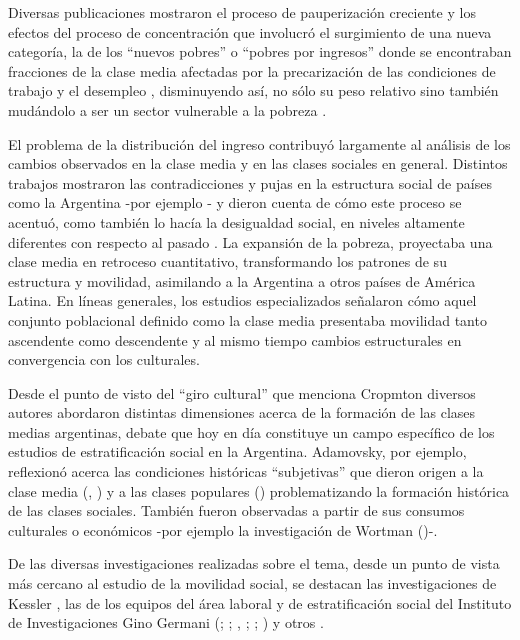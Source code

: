 \documentclass[
]{book}
\begin{document}
Diversas publicaciones mostraron el proceso de pauperización creciente y los efectos del proceso de concentración que involucró el surgimiento de una nueva categoría, la de los ``nuevos pobres'' o ``pobres por ingresos'' donde se encontraban fracciones de la clase media afectadas por la precarización de las condiciones de trabajo y el desempleo \citep{Minujin1992, Minujin1995, Murmis1992}, disminuyendo así, no sólo su peso relativo sino también mudándolo a ser un sector vulnerable a la pobreza \citep{Altimir1999, Beccaria2007, LoVuolo2004c}.

El problema de la distribución del ingreso contribuyó largamente al análisis de los cambios observados en la clase media y en las clases sociales en general. Distintos trabajos mostraron las contradicciones y pujas en la estructura social de países como la Argentina -por ejemplo \citep{Lindenboim2007}- y dieron cuenta de cómo este proceso se acentuó, como también lo hacía la desigualdad social, en niveles altamente diferentes con respecto al pasado \citep{Lopez2005a}. La expansión de la pobreza, proyectaba una clase media en retroceso cuantitativo, transformando los patrones de su estructura y movilidad, asimilando a la Argentina a otros países de América Latina. En líneas generales, los estudios especializados señalaron cómo aquel conjunto poblacional definido como la clase media presentaba movilidad tanto ascendente como descendente y al mismo tiempo cambios estructurales en convergencia con los culturales.

Desde el punto de visto del ``giro cultural'' que menciona Cropmton diversos autores \citep{Garguin2009, Losada2009, Visacovsky2009, Zimmermann2000} abordaron distintas dimensiones acerca de la formación de las clases medias argentinas, debate que hoy en día constituye un campo específico de los estudios de estratificación social en la Argentina. Adamovsky, por ejemplo, reflexionó acerca las condiciones históricas ``subjetivas'' que dieron origen a la clase media (\citet{Adamovsky2009a}, \citet{Adamovsky2009b}) y a las clases populares (\citeyearpar{Adamovsky2012}) problematizando la formación histórica de las clases sociales. También fueron observadas a partir de sus consumos culturales o económicos -por ejemplo la investigación de Wortman (\citeyearpar{Wortman2003})-.

De las diversas investigaciones realizadas sobre el tema, desde un punto de vista más cercano al estudio de la movilidad social, se destacan las investigaciones de Kessler \citeyearpar{Kessler2007}, las de los equipos del área laboral y de estratificación social del Instituto de Investigaciones Gino Germani (\citet{ChavezMolina2009}; \citet{ChavezMolina2014}; \citet{Dalle2010a}, \citet{Dalle2012}; \citet{Pla2015}; \citet{Sautu2011}) y otros \citep{InigoCarrera1999}.
\end{document}
